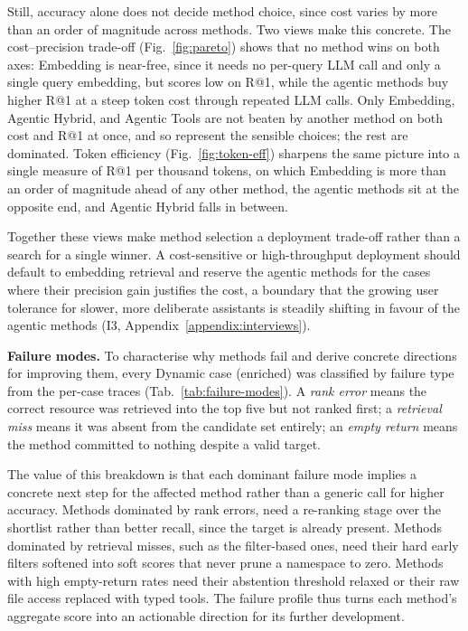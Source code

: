\documentclass[10pt,twocolumn]{article}
\begin{document}
Still, accuracy alone does not decide method choice, since cost varies by more than an order of magnitude across methods. Two views make this concrete. The cost--precision trade-off (Fig.~\ref{fig:pareto}) shows that no method wins on both axes: Embedding is near-free, since it needs no per-query LLM call and only a single query embedding, but scores low on R@1, while the agentic methods buy higher R@1 at a steep token cost through repeated LLM calls. Only Embedding, Agentic Hybrid, and Agentic Tools are not beaten by another method on both cost and R@1 at once, and so represent the sensible choices; the rest are dominated. Token efficiency (Fig.~\ref{fig:token-eff}) sharpens the same picture into a single measure of R@1 per thousand tokens, on which Embedding is more than an order of magnitude ahead of any other method, the agentic methods sit at the opposite end, and Agentic Hybrid falls in between.

Together these views make method selection a deployment trade-off rather than a search for a single winner. A cost-sensitive or high-throughput deployment should default to embedding retrieval and reserve the agentic methods for the cases where their precision gain justifies the cost, a boundary that the growing user tolerance for slower, more deliberate assistants is steadily shifting in favour of the agentic methods (I3, Appendix~\ref{appendix:interviews}).




\textbf{Failure modes.} To characterise why methods fail and derive concrete directions for improving them, every Dynamic case (enriched) was classified by failure type from the per-case traces (Tab.~\ref{tab:failure-modes}). A \emph{rank error} means the correct resource was retrieved into the top five but not ranked first; a \emph{retrieval miss} means it was absent from the candidate set entirely; an \emph{empty return} means the method committed to nothing despite a valid target. 

The value of this breakdown is that each dominant failure mode implies a concrete next step for the affected method rather than a generic call for higher accuracy. Methods dominated by rank errors, need a re-ranking stage over the shortlist rather than better recall, since the target is already present. Methods dominated by retrieval misses, such as the filter-based ones, need their hard early filters softened into soft scores that never prune a namespace to zero. Methods with high empty-return rates need their abstention threshold relaxed or their raw file access replaced with typed tools. The failure profile thus turns each method's aggregate score into an actionable direction for its further development.
\end{document}
